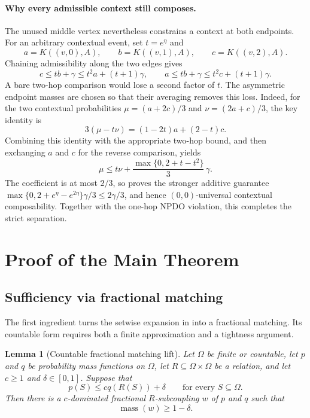 \documentclass[11pt]{article}
\newtheorem{lemma}{Lemma}[section]
\begin{document}
\paragraph{Why every admissible context still composes.}
The unused middle vertex nevertheless constrains a context at both endpoints.
For an arbitrary contextual event, set $t=e^\eta$ and
\[
 a=K((v,0),A),\qquad b=K((v,1),A),\qquad c=K((v,2),A).
\]
Chaining admissibility along the two edges gives
\[
 c\leq tb+\gamma\leq t^2a+(t+1)\gamma,
 \qquad
 a\leq tb+\gamma\leq t^2c+(t+1)\gamma.
\]
A bare two-hop comparison would lose a second factor of $t$.  The asymmetric
endpoint masses are chosen so that their averaging removes this loss.  Indeed,
for the two contextual probabilities
$\mu=(a+2c)/3$ and $\nu=(2a+c)/3$, the key identity is
\[
 3(\mu-t\nu)=(1-2t)a+(2-t)c.
\]
Combining this identity with the appropriate two-hop bound, and then
exchanging $a$ and $c$ for the reverse comparison, yields
\[
 \mu\leq t\nu+
 \frac{\max\{0,2+t-t^2\}}{3}\,\gamma.
\]
The coefficient is at most $2/3$, so  proves the stronger
additive guarantee
$\max\{0,2+e^\eta-e^{2\eta}\}\gamma/3\leq2\gamma/3$, and hence
$(0,0)$-universal contextual composability.  Together with the one-hop NPDO
violation, this completes the strict separation.

\section{Proof of the Main Theorem}
\label{sec:main-proof}

\subsection{Sufficiency via fractional matching}

The first ingredient turns the setwise expansion in  into a
fractional matching.  Its countable form requires both a finite approximation
and a tightness argument.

\begin{lemma}[Countable fractional matching lift]
\label{lem:matching}
Let $\Omega$ be finite or countable, let $p$ and $q$ be probability mass
functions on $\Omega$, let $R\subseteq\Omega\times\Omega$ be a relation, and
let $c\geq1$ and $\delta\in[0,1]$.  Suppose that
\begin{equation}
 p(S)\leq c q(R(S))+\delta
 \qquad\text{for every }S\subseteq\Omega.
 \label{eq:hall}
\end{equation}
Then there is a $c$-dominated fractional $R$-subcoupling $w$ of $p$ and $q$
such that
\begin{equation}
 \operatorname{mass}(w)\geq1-\delta.
 \label{eq:w-mass}
\end{equation}
\end{lemma}
\end{document}
